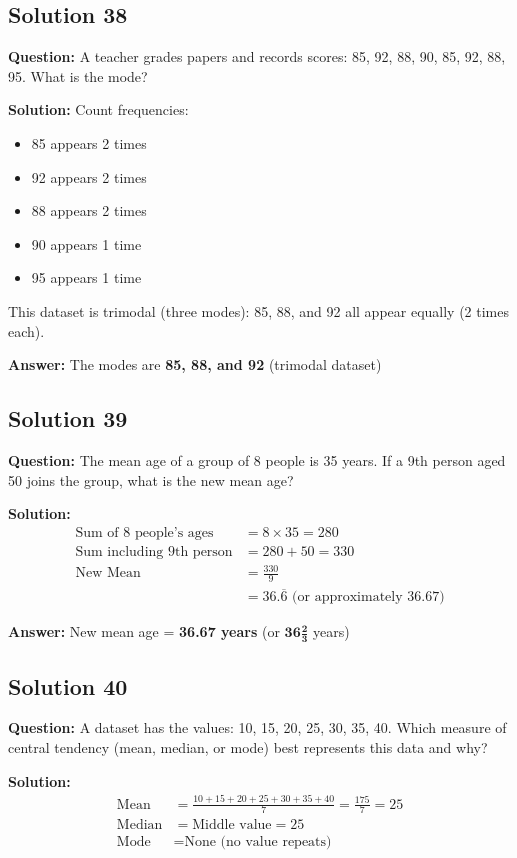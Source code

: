 \documentclass[12pt,a4paper]{article}
\begin{document}
\subsection*{Solution 38}
\textbf{Question:} A teacher grades papers and records scores: 85, 92, 88, 90, 85, 92, 88, 95. What is the mode?

\textbf{Solution:} Count frequencies:
\begin{itemize}
    \item 85 appears 2 times
    \item 92 appears 2 times
    \item 88 appears 2 times
    \item 90 appears 1 time
    \item 95 appears 1 time
\end{itemize}

This dataset is trimodal (three modes): 85, 88, and 92 all appear equally (2 times each).

\textbf{Answer:} The modes are \textbf{85, 88, and 92} (trimodal dataset)

\subsection*{Solution 39}
\textbf{Question:} The mean age of a group of 8 people is 35 years. If a 9th person aged 50 joins the group, what is the new mean age?

\textbf{Solution:}
\begin{align*}
\text{Sum of 8 people's ages} &= 8 \times 35 = 280 \\
\text{Sum including 9th person} &= 280 + 50 = 330 \\
\text{New Mean} &= \frac{330}{9} \\
&= 36.\overline{6} \text{ (or approximately 36.67)}
\end{align*}

\textbf{Answer:} New mean age = \textbf{36.67 years} (or $\mathbf{36\frac{2}{3}}$ years)

\subsection*{Solution 40}
\textbf{Question:} A dataset has the values: 10, 15, 20, 25, 30, 35, 40. Which measure of central tendency (mean, median, or mode) best represents this data and why?

\textbf{Solution:}
\begin{align*}
\text{Mean} &= \frac{10 + 15 + 20 + 25 + 30 + 35 + 40}{7} = \frac{175}{7} = 25 \\
\text{Median} &= \text{Middle value} = 25 \\
\text{Mode} &= \text{None (no value repeats)}
\end{align*}
\end{document}
